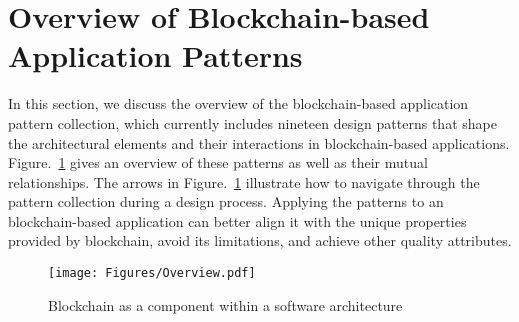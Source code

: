 


\section{Overview of Blockchain-based Application Patterns}
\label{sec:patternCollection}

In this section, we discuss the overview of the blockchain-based application pattern collection, which currently includes nineteen design patterns that shape the architectural elements and their interactions in blockchain-based applications. Figure.~\ref{fig:overview} gives an overview of these patterns as well as their mutual relationships. The arrows in Figure.~\ref{fig:overview} illustrate how to navigate through the pattern collection during a design process. Applying the patterns to an blockchain-based application can better align it with the unique properties provided by blockchain, avoid its limitations, and achieve other quality attributes.


\begin{figure}[t]
\begin{center}
\texttt{[image: Figures/Overview.pdf]}
\caption{Blockchain as a component within a software architecture}\label{fig:overview}
\end{center}
\end{figure}




